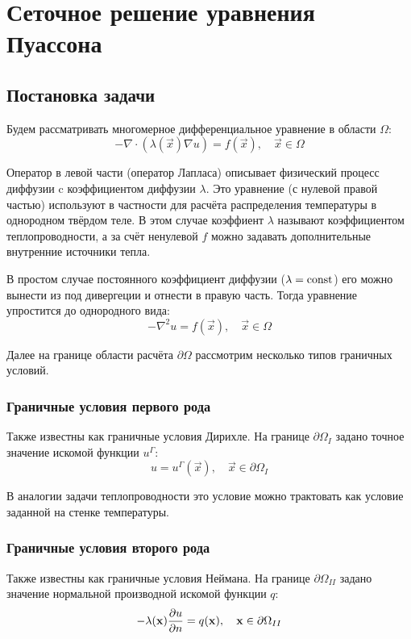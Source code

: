 \section{Сеточное решение уравнения Пуассона}
\subsection{Постановка задачи}

Будем рассматривать многомерное дифференциальное уравнение в области $\Omega$:
\begin{equation}
    \label{eq:poissonnd_lam}
    -\nabla\cdot\left(\lambda(\vec x)\nabla u\right) = f(\vec x), \quad \vec x \in \Omega
\end{equation}

Оператор в левой части (оператор Лапласа)
описывает физический процесс диффузии c коэффициентом диффузии $\lambda$.
Это уравнение (с нулевой правой частью) используют
в частности для расчёта распределения температуры в однородном твёрдом теле.
В этом случае коэффиент $\lambda$ называют коэффициентом теплопроводности,
а за счёт ненулевой $f$ можно задавать дополнительные
внутренние источники тепла.

В простом случае постоянного коэффициент диффузии ($\lambda = {\rm const}$) его
можно вынести из под дивергеции и отнести в правую часть. Тогда уравнение упростится до однородного вида:
\begin{equation}
    \label{eq:poissonnd}
    -\nabla^2 u = f(\vec x), \quad \vec x \in \Omega
\end{equation}

Далее на границе области расчёта $\partial \Omega$
рассмотрим несколько типов граничных условий.

\subsubsection{Граничные условия первого рода}
Также известны как граничные условия Дирихле.
На границе $\partial \Omega_{I}$ задано точное значение искомой функции $u^\Gamma$:
\begin{equation}
\label{eq:poissonnd_bc}
u = u^\Gamma(\vec x), \quad \vec x \in \partial\Omega_I
\end{equation}

В аналогии задачи теплопроводности это условие
можно трактовать как условие заданной на стенке температуры.

\subsubsection{Граничные условия второго рода}
Также известны как граничные условия Неймана.
На границе $\partial \Omega_{II}$ задано значение нормальной производной искомой функции $q$:
\begin{equation}
\label{eq:poissonnd_bc2}
-\lambda(\boldsymbol{\rm x})\frac{\partial u}{\partial n} = q(\boldsymbol{\rm x}), \quad \boldsymbol{\rm x} \in \partial\Omega_{II}
\end{equation}

